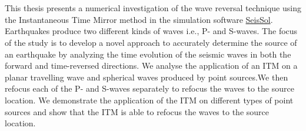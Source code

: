 \chapter{\abstractname}

This thesis presents a numerical investigation of the wave reversal technique using the Instantaneous 
Time Mirror method in the simulation software \href{https://seissol.org/}{SeisSol}. Earthquakes produce two different kinds of waves i.e., P- and S-waves. 
The focus of the study is to develop a novel approach to accurately determine the source of an earthquake by analyzing the time evolution 
of the seismic waves in both the forward and time-reversed directions. We analyse the application of an \acf{ITM} on a planar travelling wave and spherical waves
produced by point sources.We then refocus each of the P- and S-waves separately to refocus the waves to the source location. We demonstrate the application
of the \ac{ITM} on different types of point sources and show that the \ac{ITM} is able to refocus the waves to the source location.